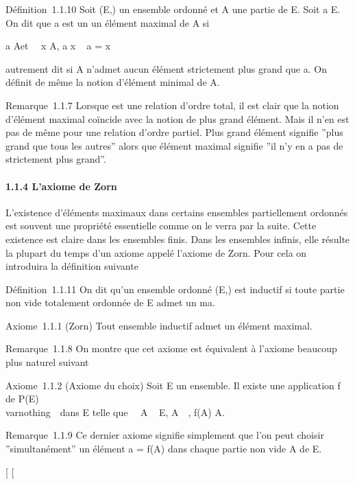 \documentclass[]{article}
\begin{document}
Définition~1.1.10 Soit (E,\leqslant) un ensemble ordonné et A une partie de E.
Soit a \in E. On dit que a est un un élément maximal de A si

a \in A\text et \quad
\forall~~x \in A, a \leqslant x \rigtharrow~ a = x

autrement dit si A n'admet aucun élément strictement plus grand que a.
On définit de même la notion d'élément minimal de A.

Remarque~1.1.7 Lorsque \leqslant est une relation d'ordre total, il est clair
que la notion d'élément maximal coïncide avec la notion de plus grand
élément. Mais il n'en est pas de même pour une relation d'ordre partiel.
Plus grand élément signifie ''plus grand que tous les autres'' alors que
élément maximal signifie ''il n'y en a pas de strictement plus grand''.

\paragraph{1.1.4 L'axiome de Zorn}

L'existence d'éléments maximaux dans certains ensembles partiellement
ordonnés est souvent une propriété essentielle comme on le verra par la
suite. Cette existence est claire dans les ensembles finis. Dans les
ensembles infinis, elle résulte la plupart du temps d'un axiome appelé
l'axiome de Zorn. Pour cela on introduira la définition suivante

Définition~1.1.11 On dit qu'un ensemble ordonné (E,\leqslant) est inductif si
toute partie non vide totalement ordonnée de E admet un ma\jmathorant.

Axiome~1.1.1 (Zorn) Tout ensemble inductif admet un élément maximal.

Remarque~1.1.8 On montre que cet axiome est équivalent à l'axiome
beaucoup plus naturel suivant

Axiome~1.1.2 (Axiome du choix) Soit E un ensemble. Il existe une
application f de P(E) \diagdown\\varnothing~\ dans E
telle que \forall~~A \subset~ E,
A\neq~\varnothing~, f(A) \in A.

Remarque~1.1.9 Ce dernier axiome signifie simplement que l'on peut
choisir ''simultanément'' un élément a = f(A) dans chaque partie non
vide A de E.

{[}
{[}
\end{document}
